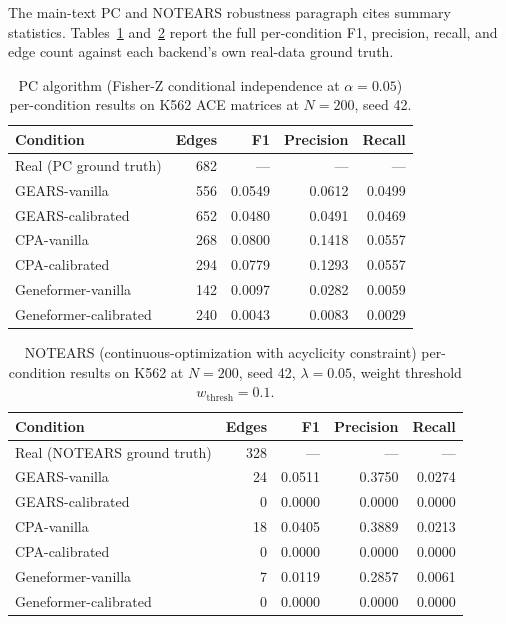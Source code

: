\documentclass{article}
\begin{document}
The main-text PC and NOTEARS robustness paragraph cites summary statistics. Tables~\ref{tab:pc_full} and~\ref{tab:notears_full} report the full per-condition F1, precision, recall, and edge count against each backend's own real-data ground truth.

\begin{table}[h]
\centering
\small
\begin{tabular}{lrrrr}
\toprule
\textbf{Condition} & \textbf{Edges} & \textbf{F1} & \textbf{Precision} & \textbf{Recall} \\
\midrule
Real (PC ground truth)   & 682 & --- & --- & --- \\
GEARS-vanilla            & 556 & 0.0549 & 0.0612 & 0.0499 \\
GEARS-calibrated         & 652 & 0.0480 & 0.0491 & 0.0469 \\
CPA-vanilla              & 268 & 0.0800 & 0.1418 & 0.0557 \\
CPA-calibrated           & 294 & 0.0779 & 0.1293 & 0.0557 \\
Geneformer-vanilla       & 142 & 0.0097 & 0.0282 & 0.0059 \\
Geneformer-calibrated    & 240 & 0.0043 & 0.0083 & 0.0029 \\
\bottomrule
\end{tabular}
\caption{PC algorithm (Fisher-Z conditional independence at $\alpha{=}0.05$) per-condition results on K562 ACE matrices at $N{=}200$, seed 42.}
\label{tab:pc_full}
\end{table}

\begin{table}[h]
\centering
\small
\begin{tabular}{lrrrr}
\toprule
\textbf{Condition} & \textbf{Edges} & \textbf{F1} & \textbf{Precision} & \textbf{Recall} \\
\midrule
Real (NOTEARS ground truth) & 328 & --- & --- & --- \\
GEARS-vanilla            & 24  & 0.0511 & 0.3750 & 0.0274 \\
GEARS-calibrated         & 0   & 0.0000 & 0.0000 & 0.0000 \\
CPA-vanilla              & 18  & 0.0405 & 0.3889 & 0.0213 \\
CPA-calibrated           & 0   & 0.0000 & 0.0000 & 0.0000 \\
Geneformer-vanilla       & 7   & 0.0119 & 0.2857 & 0.0061 \\
Geneformer-calibrated    & 0   & 0.0000 & 0.0000 & 0.0000 \\
\bottomrule
\end{tabular}
\caption{NOTEARS (continuous-optimization with acyclicity constraint) per-condition results on K562 at $N{=}200$, seed 42, $\lambda{=}0.05$, weight threshold $w_{\mathrm{thresh}}{=}0.1$.}
\label{tab:notears_full}
\end{table}
\end{document}
